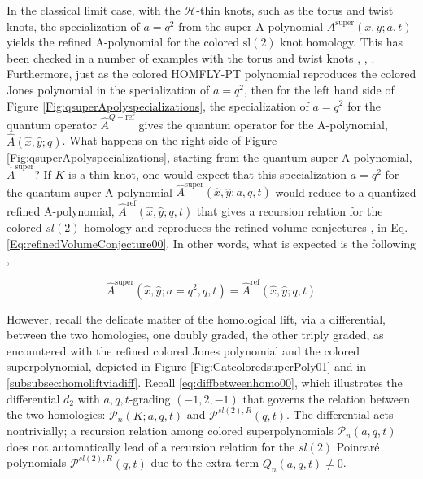 \documentclass[a4paper,titlepage,twoside]{book}
\begin{document}
In the classical limit case, with the $\mathcal{H}$-thin knots, such as the torus and twist knots, the specialization of $a=q^2$ from the super-A-polynomial $A^{\text{super}}(x,y;a,t)$ yields the refined A-polynomial for the colored $\text{sl}{(2)}$ knot homology.  This has been checked in a number of examples with the torus and twist knots \cite{bib:FGS2012}, \cite{FujiSulkowski2013}, \cite{NRZ2013}.  Furthermore, just as the colored HOMFLY-PT polynomial reproduces the colored Jones polynomial in the specialization of $a=q^2$, then for the left hand side of Figure \ref{Fig:qsuperApolyspecializations}, the specialization of $a=q^2$ for the quantum operator $\widehat{A}^{Q-\text{ref}}$ gives the quantum operator for the A-polynomial, $\widehat{A}{(\widehat{x},\widehat{y};q)}$.  What happens on the right side of Figure \ref{Fig:qsuperApolyspecializations}, starting from the quantum super-A-polynomial, $\widehat{A}^{\text{super}}$?  If $K$ is a thin knot, one would expect that this specialization $a=q^2$ for the quantum super-A-polynomial $\widehat{A}^{\text{super}}{(\widehat{x},\widehat{y};a,q,t)}$ would reduce to a quantized refined A-polynomial, $\widehat{A}^{\text{ref}}{(\widehat{x}, \widehat{y};q,t)}$ that gives a recursion relation for the colored $sl{(2)}$ homology and reproduces the refined volume conjectures \cite{FujiGukovSulkowski2012}, in Eq. \eqref{Eq:refinedVolumeConjecture00}.  In other words, what is expected is the following  \cite{bib:FGS2012}, \cite{FujiSulkowski2013}:

\begin{equation}
  \widehat{A}^{\text{super}}{ ( \widehat{x}, \widehat{y}; a=q^2, q,t) } = \widehat{A}^{\text{ref}}{ (\widehat{x}, \widehat{y}; q,t)} \label{eq:qsApdiffrelation00}
\end{equation}

However, recall the delicate matter of the homological lift, via a differential, between the two homologies, one doubly graded, the other triply graded, as encountered with the refined colored Jones polynomial and the colored superpolynomial, depicted in Figure \ref{Fig:CatcoloredsuperPoly01} and in \ref{subsubsec:homoliftviadiff}.  Recall \eqref{eq:diffbetweenhomo00}, which illustrates the differential $d_2$ with $a,q,t$-grading $(-1,2,-1)$ that governs the relation between the two homologies: $\mathcal{P}_n{(K;a,q,t)}$ and $\mathcal{P}^{sl{(2)},R}{(q,t)}$.  The differential acts nontrivially; a recursion relation among colored superpolynomials $\mathcal{P}_n{(a,q,t)}$ does not automatically lead of a recursion relation for the $sl{(2)}$ Poincar\'{e} polynomials $\mathcal{P}^{sl{(2)},R}{ (q,t)}$ due to the extra term $Q_n{(a,q,t)} \neq 0$.  
\end{document}
